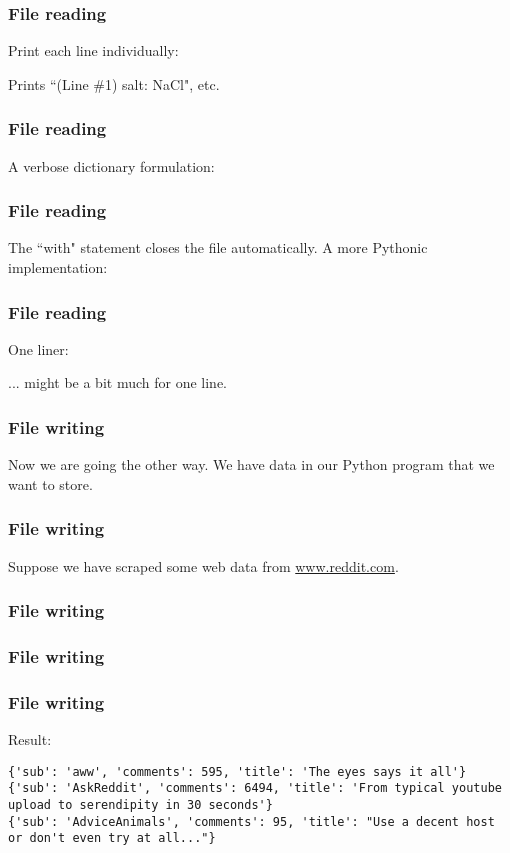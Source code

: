 \documentclass{beamer}
\begin{document}
\begin{frame}
\frametitle{File reading}
Print each line individually:

\vspace{0.3in}
Prints ``(Line \#1) salt: NaCl", etc.
\end{frame}


\begin{frame}
\frametitle{File reading}
A verbose dictionary formulation:
\end{frame}


\begin{frame}
\frametitle{File reading}
The ``with" statement closes the file automatically.  A more Pythonic implementation:
\end{frame}

\begin{frame}
\frametitle{File reading}
One liner:

\vspace{0.3in}
... might be a bit much for one line.
\end{frame}


\begin{frame}
\frametitle{File writing}
Now we are going the other way.  We have data in our Python program that we want to store.
\end{frame}

\begin{frame}
\frametitle{File writing}
Suppose we have scraped some web data from \url{www.reddit.com}.
\end{frame}

\begin{frame}
\frametitle{File writing}
\end{frame}

\begin{frame}
\frametitle{File writing}
\end{frame}

\begin{frame}[fragile]
\frametitle{File writing}
Result:
\begin{verbatim}
{'sub': 'aww', 'comments': 595, 'title': 'The eyes says it all'}
{'sub': 'AskReddit', 'comments': 6494, 'title': 'From typical youtube upload to serendipity in 30 seconds'}
{'sub': 'AdviceAnimals', 'comments': 95, 'title': "Use a decent host or don't even try at all..."}
\end{verbatim}
\end{frame}
\end{document}
